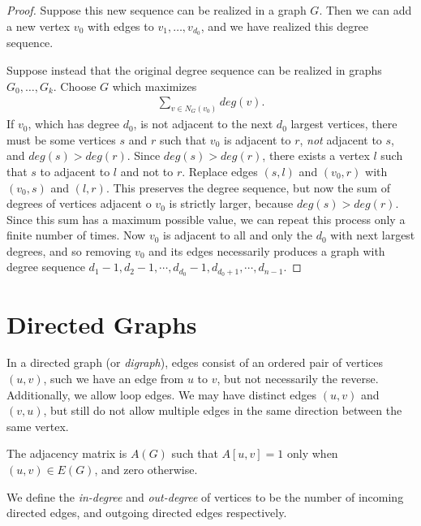 \begin{proof}
    Suppose this new sequence can be realized in a graph $G$. Then we can add a new vertex $v_0$ with edges to $v_1, \ldots, v_{d_0}$, and we have realized this degree sequence.

    Suppose instead that the original degree sequence can be realized in graphs $G_0,\ldots, G_k$. Choose $G$ which maximizes
    \begin{align*}
        \sum_{v \in N_G(v_0)}deg(v).
    \end{align*}
    If $v_0$, which has degree $d_0$, is not adjacent to the next $d_0$ largest vertices, there must be some vertices $s$ and $r$ such that $v_0$ is adjacent to $r$, \emph{not} adjacent to $s$, and $deg(s) > deg(r)$. Since $deg(s) > deg(r)$, there exists a vertex $l$ such that $s$ to adjacent to $l$ and not to $r$. Replace edges $(s, l)$ and $(v_0, r)$ with $(v_0, s)$ and $(l, r)$. This preserves the degree sequence, but now the sum of degrees of vertices adjacent o $v_0$ is strictly larger, because $deg(s) > deg(r)$. Since this sum has a maximum possible value, we can repeat this process only a finite number of times. Now $v_0$ is adjacent to all and only the $d_0$ with next largest degrees, and so removing $v_0$ and its edges necessarily produces a graph with degree sequence $d_{1}-1, d_{2}-1, \cdots, d_{d_0}-1, d_{d_0+1}, \cdots, d_{n-1}$.
\end{proof}

\section{Directed Graphs}

\begin{defn}
    In a directed graph (or \emph{digraph}), edges consist of an ordered pair of vertices $(u, v)$, such we have an edge from $u$ to $v$, but not necessarily the reverse. Additionally, we allow loop edges. We may have distinct edges $(u, v)$ and $(v, u)$, but still do not allow multiple edges in the same direction between the same vertex.
\end{defn}

\begin{defn}
    The adjacency matrix is $A(G)$ such that $A[u, v] = 1$ only when $(u, v) \in E(G)$, and zero otherwise.
\end{defn}

\begin{defn}
    We define the \emph{in-degree} and \emph{out-degree} of vertices to be the number of incoming directed edges, and outgoing directed edges respectively.
\end{defn}


